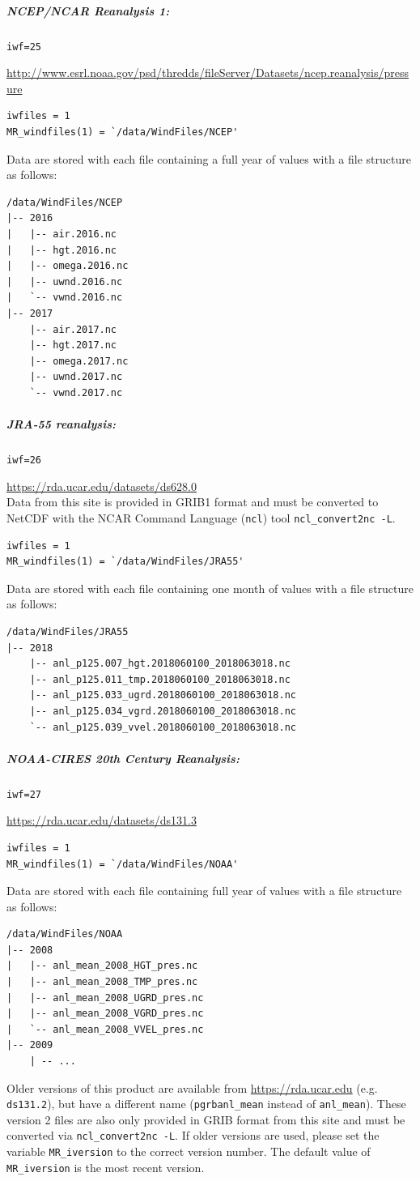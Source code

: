 \documentclass[11pt]{article}   %
\begin{document}
\subparagraph{NCEP/NCAR Reanalysis 1:}
\texttt{iwf=25}

\url{http://www.esrl.noaa.gov/psd/thredds/fileServer/Datasets/ncep.reanalysis/pressure}
\begin{verbatim}
iwfiles = 1
MR_windfiles(1) = `/data/WindFiles/NCEP'
\end{verbatim}
Data are stored with each file containing a full year of values with a file structure as follows:
\begin{verbatim}
/data/WindFiles/NCEP
|-- 2016
|   |-- air.2016.nc
|   |-- hgt.2016.nc
|   |-- omega.2016.nc
|   |-- uwnd.2016.nc
|   `-- vwnd.2016.nc
|-- 2017
    |-- air.2017.nc
    |-- hgt.2017.nc
    |-- omega.2017.nc
    |-- uwnd.2017.nc
    `-- vwnd.2017.nc
\end{verbatim}

\subparagraph{JRA-55 reanalysis:}
\texttt{iwf=26}

\url{https://rda.ucar.edu/datasets/ds628.0}\\
Data from this site is provided in GRIB1 format and must be converted to NetCDF
with the NCAR Command Language (\texttt{ncl}) tool \texttt{ncl\_convert2nc -L}.
\begin{verbatim}
iwfiles = 1
MR_windfiles(1) = `/data/WindFiles/JRA55'
\end{verbatim}
Data are stored with each file containing one month of values with a file structure as follows:
\begin{verbatim}
/data/WindFiles/JRA55
|-- 2018
    |-- anl_p125.007_hgt.2018060100_2018063018.nc
    |-- anl_p125.011_tmp.2018060100_2018063018.nc
    |-- anl_p125.033_ugrd.2018060100_2018063018.nc
    |-- anl_p125.034_vgrd.2018060100_2018063018.nc
    `-- anl_p125.039_vvel.2018060100_2018063018.nc
\end{verbatim}

\subparagraph{NOAA-CIRES 20th Century Reanalysis:}
\texttt{iwf=27}

\url{https://rda.ucar.edu/datasets/ds131.3}
\begin{verbatim}
iwfiles = 1
MR_windfiles(1) = `/data/WindFiles/NOAA'
\end{verbatim}
Data are stored with each file containing full year of values with a file structure as follows:
\begin{verbatim}
/data/WindFiles/NOAA
|-- 2008
|   |-- anl_mean_2008_HGT_pres.nc
|   |-- anl_mean_2008_TMP_pres.nc
|   |-- anl_mean_2008_UGRD_pres.nc
|   |-- anl_mean_2008_VGRD_pres.nc
|   `-- anl_mean_2008_VVEL_pres.nc
|-- 2009
    | -- ...
\end{verbatim}
Older versions of this product are available from \url{https://rda.ucar.edu} (e.g. \texttt{ds131.2}),
but have a different name (\texttt{pgrbanl\_mean} instead of \texttt{anl\_mean}). These version 2
files are also only provided in GRIB format from this site and must be converted via \texttt{ncl\_convert2nc -L}.
If older versions are used, please set the variable \texttt{MR\_iversion} to the correct version number.
The default value of \texttt{MR\_iversion} is the most recent version.
\end{document}

